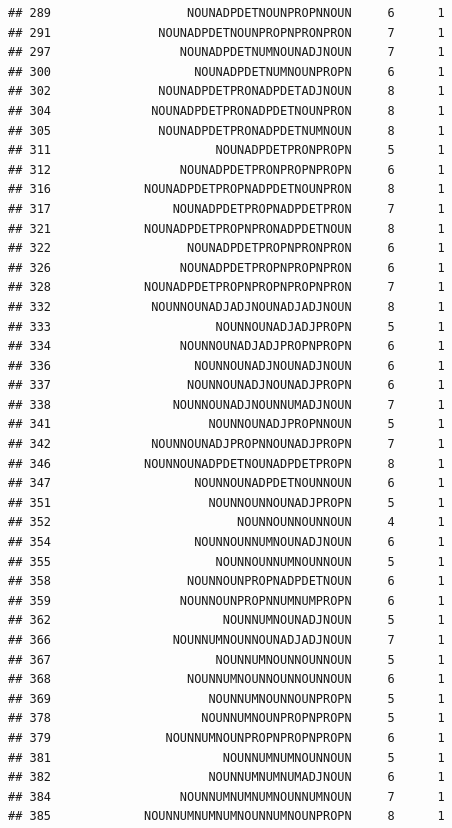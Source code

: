 \documentclass[]{article}
\begin{document}
\begin{verbatim}
## 289                   NOUNADPDETNOUNPROPNNOUN     6      1
## 291               NOUNADPDETNOUNPROPNPRONPRON     7      1
## 297                  NOUNADPDETNUMNOUNADJNOUN     7      1
## 300                    NOUNADPDETNUMNOUNPROPN     6      1
## 302               NOUNADPDETPRONADPDETADJNOUN     8      1
## 304              NOUNADPDETPRONADPDETNOUNPRON     8      1
## 305               NOUNADPDETPRONADPDETNUMNOUN     8      1
## 311                       NOUNADPDETPRONPROPN     5      1
## 312                  NOUNADPDETPRONPROPNPROPN     6      1
## 316             NOUNADPDETPROPNADPDETNOUNPRON     8      1
## 317                 NOUNADPDETPROPNADPDETPRON     7      1
## 321             NOUNADPDETPROPNPRONADPDETNOUN     8      1
## 322                   NOUNADPDETPROPNPRONPRON     6      1
## 326                  NOUNADPDETPROPNPROPNPRON     6      1
## 328             NOUNADPDETPROPNPROPNPROPNPRON     7      1
## 332              NOUNNOUNADJADJNOUNADJADJNOUN     8      1
## 333                       NOUNNOUNADJADJPROPN     5      1
## 334                  NOUNNOUNADJADJPROPNPROPN     6      1
## 336                    NOUNNOUNADJNOUNADJNOUN     6      1
## 337                   NOUNNOUNADJNOUNADJPROPN     6      1
## 338                 NOUNNOUNADJNOUNNUMADJNOUN     7      1
## 341                      NOUNNOUNADJPROPNNOUN     5      1
## 342              NOUNNOUNADJPROPNNOUNADJPROPN     7      1
## 346             NOUNNOUNADPDETNOUNADPDETPROPN     8      1
## 347                    NOUNNOUNADPDETNOUNNOUN     6      1
## 351                      NOUNNOUNNOUNADJPROPN     5      1
## 352                          NOUNNOUNNOUNNOUN     4      1
## 354                    NOUNNOUNNUMNOUNADJNOUN     6      1
## 355                       NOUNNOUNNUMNOUNNOUN     5      1
## 358                   NOUNNOUNPROPNADPDETNOUN     6      1
## 359                  NOUNNOUNPROPNNUMNUMPROPN     6      1
## 362                        NOUNNUMNOUNADJNOUN     5      1
## 366                 NOUNNUMNOUNNOUNADJADJNOUN     7      1
## 367                       NOUNNUMNOUNNOUNNOUN     5      1
## 368                   NOUNNUMNOUNNOUNNOUNNOUN     6      1
## 369                      NOUNNUMNOUNNOUNPROPN     5      1
## 378                     NOUNNUMNOUNPROPNPROPN     5      1
## 379                NOUNNUMNOUNPROPNPROPNPROPN     6      1
## 381                        NOUNNUMNUMNOUNNOUN     5      1
## 382                      NOUNNUMNUMNUMADJNOUN     6      1
## 384                  NOUNNUMNUMNUMNOUNNUMNOUN     7      1
## 385             NOUNNUMNUMNUMNOUNNUMNOUNPROPN     8      1

\end{verbatim}
\end{document}
